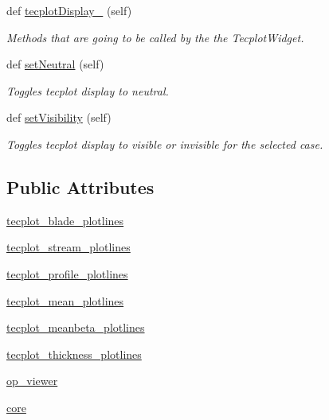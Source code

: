 \begin{DoxyCompactItemize}
def \hyperlink{classtecplot__modules_1_1tecplot__display_1_1_tec_plot_window_acdc9dc387494507084a2ab2cc0c8d9ac}{tecplot\+Display\+\_} (self)
\begin{DoxyCompactList}\small\item\em Methods that are going to be called by the the Tecplot\+Widget. \end{DoxyCompactList}\item 
def \hyperlink{classtecplot__modules_1_1tecplot__display_1_1_tec_plot_window_ad80163041f7884f536d1421860c4adc2}{set\+Neutral} (self)
\begin{DoxyCompactList}\small\item\em Toggles tecplot display to neutral. \end{DoxyCompactList}\item 
def \hyperlink{classtecplot__modules_1_1tecplot__display_1_1_tec_plot_window_ae50e0f3c4051d791ed30a2e9de5233ea}{set\+Visibility} (self)
\begin{DoxyCompactList}\small\item\em Toggles tecplot display to visible or invisible for the selected case. \end{DoxyCompactList}\end{DoxyCompactItemize}
\subsection*{Public Attributes}
\begin{DoxyCompactItemize}
\item 
\hyperlink{classtecplot__modules_1_1tecplot__display_1_1_tec_plot_window_a97bc6a6c7074f874028cd2afbbad4082}{tecplot\+\_\+blade\+\_\+plotlines}
\item 
\hyperlink{classtecplot__modules_1_1tecplot__display_1_1_tec_plot_window_a103d285631a0d45198d834c8a98cf72a}{tecplot\+\_\+stream\+\_\+plotlines}
\item 
\hyperlink{classtecplot__modules_1_1tecplot__display_1_1_tec_plot_window_a20a9b77de151d414f78ab14a5ee30143}{tecplot\+\_\+profile\+\_\+plotlines}
\item 
\hyperlink{classtecplot__modules_1_1tecplot__display_1_1_tec_plot_window_ad430a4835103d6c1e22b1d81a829bc74}{tecplot\+\_\+mean\+\_\+plotlines}
\item 
\hyperlink{classtecplot__modules_1_1tecplot__display_1_1_tec_plot_window_a552371e32854caef73cb7386140ebab8}{tecplot\+\_\+meanbeta\+\_\+plotlines}
\item 
\hyperlink{classtecplot__modules_1_1tecplot__display_1_1_tec_plot_window_a3291e8bf0c5c69a20e3e9299dc363db2}{tecplot\+\_\+thickness\+\_\+plotlines}
\item 
\hyperlink{classtecplot__modules_1_1tecplot__display_1_1_tec_plot_window_a03539a28f4d15d303da92341074ab6b6}{op\+\_\+viewer}
\item 
\hyperlink{classtecplot__modules_1_1tecplot__display_1_1_tec_plot_window_a7d3fabc52fc4c2d52b9aa4efea25131a}{core}
\end{DoxyCompactItemize}


